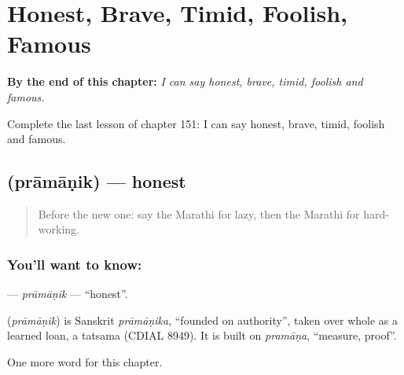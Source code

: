 
\chapter{Honest, Brave, Timid, Foolish, Famous}
\label{ch:mr-honest-brave-timid-foolish-famous}

\begin{chapteropening}
\textbf{By the end of this chapter:} \emph{I can say honest, brave, timid, foolish and famous.}

Complete the last lesson of chapter 151: I can say honest, brave, timid, foolish and famous.
\end{chapteropening}

\section[\texorpdfstring{\mr{प्रामाणिक} (prāmāṇik)}{प्रामाणिक (prāmāṇik)}]{ (prāmāṇik) — honest}

\label{lesson:MR-C151-pramanik}



\begin{quote}
Before the new one: say the Marathi for lazy, then the Marathi for hard-working.
\end{quote}

\subsection*{You'll want to know: }
\textbf{} — \emph{prāmāṇik} — \textquotedblleft{}honest\textquotedblright{}.

\begin{cousinweb}
\textbf{} (\emph{prāmāṇik}) is Sanskrit \emph{prāmāṇika}, \textquotedblleft{}founded on authority\textquotedblright{}, taken over whole as a learned loan, a tatsama (CDIAL 8949). It is built on \emph{pramāṇa}, \textquotedblleft{}measure, proof\textquotedblright{}.
\end{cousinweb}

\begin{grammarlens}[title={What you've built}]
One more word for this chapter.
\end{grammarlens}


